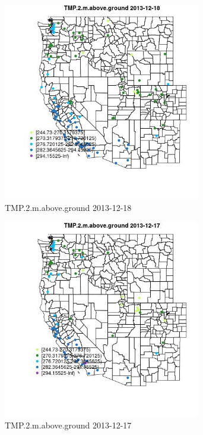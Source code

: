 \begin{figure} 
\centering  
\includegraphics[width=0.77\textwidth]{Code_Outputs/Report_ML_input_PM25_Step4_part_e_de_duplicated_aves_MapObsTMP2maboveground2013-12-18.jpg} 
\caption{\label{fig:Report_ML_input_PM25_Step4_part_e_de_duplicated_avesMapObsTMP2maboveground2013-12-18}TMP.2.m.above.ground 2013-12-18} 
\end{figure} 
 

\begin{figure} 
\centering  
\includegraphics[width=0.77\textwidth]{Code_Outputs/Report_ML_input_PM25_Step4_part_e_de_duplicated_aves_MapObsTMP2maboveground2013-12-17.jpg} 
\caption{\label{fig:Report_ML_input_PM25_Step4_part_e_de_duplicated_avesMapObsTMP2maboveground2013-12-17}TMP.2.m.above.ground 2013-12-17} 
\end{figure} 
 

